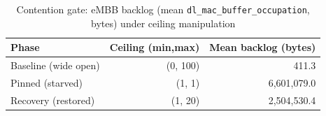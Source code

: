 \begin{table}[t]
\centering
\caption{Contention gate: eMBB backlog (mean \texttt{dl\_mac\_buffer\_occupation}, bytes) under ceiling manipulation}
\label{tab:contention}
\begin{tabular}{@{}lrr@{}}
\toprule
Phase & Ceiling (min,max) & Mean backlog (bytes) \\
\midrule
Baseline (wide open) & (0, 100) & 411.3 \\
Pinned (starved) & (1, 1) & 6{,}601{,}079.0 \\
Recovery (restored) & (1, 20) & 2{,}504{,}530.4 \\
\bottomrule
\end{tabular}
\end{table}
